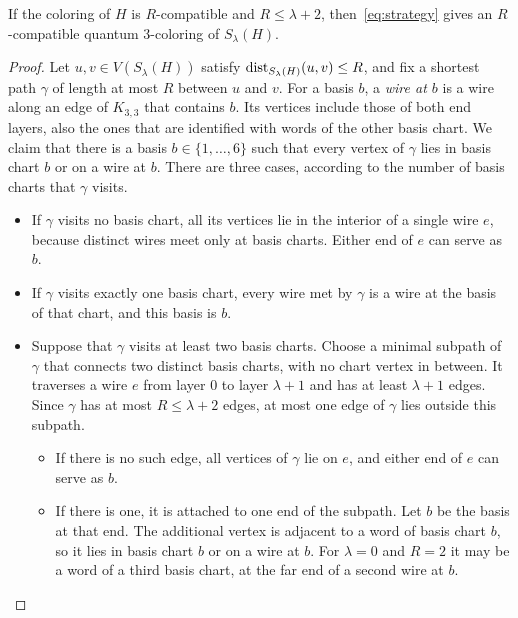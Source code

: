 \begin{lemma}\label{lem:radius-lift}
If the coloring of $H$ is $R$-compatible and $R\le\lambda+2$, then~\eqref{eq:strategy} gives an $R$-compatible quantum $3$-coloring of $S_\lambda(H)$.
\end{lemma}
\begin{proof}
Let $u,v\in V(S_\lambda(H))$ satisfy $\operatorname{dist}_{S_\lambda(H)}(u,v)\le R$, and fix a shortest path $\gamma$ of length at most $R$ between $u$ and $v$. For a basis $b$, a \emph{wire at $b$} is a wire along an edge of $K_{3,3}$ that contains $b$. Its vertices include those of both end layers, also the ones that are identified with words of the other basis chart. We claim that there is a basis $b\in\{1,\ldots,6\}$ such that every vertex of $\gamma$ lies in basis chart $b$ or on a wire at $b$. There are three cases, according to the number of basis charts that $\gamma$ visits.
\begin{itemize}
\item If $\gamma$ visits no basis chart, all its vertices lie in the interior of a single wire $e$, because distinct wires meet only at basis charts. Either end of $e$ can serve as $b$.
\item If $\gamma$ visits exactly one basis chart, every wire met by $\gamma$ is a wire at the basis of that chart, and this basis is $b$.
\item Suppose that $\gamma$ visits at least two basis charts. Choose a minimal subpath of $\gamma$ that connects two distinct basis charts, with no chart vertex in between. It traverses a wire $e$ from layer $0$ to layer $\lambda+1$ and has at least $\lambda+1$ edges. Since $\gamma$ has at most $R\le\lambda+2$ edges, at most one edge of $\gamma$ lies outside this subpath.
  \begin{itemize}
  \item If there is no such edge, all vertices of $\gamma$ lie on $e$, and either end of $e$ can serve as $b$.
  \item If there is one, it is attached to one end of the subpath. Let $b$ be the basis at that end. The additional vertex is adjacent to a word of basis chart $b$, so it lies in basis chart $b$ or on a wire at $b$. For $\lambda=0$ and $R=2$ it may be a word of a third basis chart, at the far end of a second wire at $b$.
  \end{itemize}
\end{itemize}


\end{proof}

